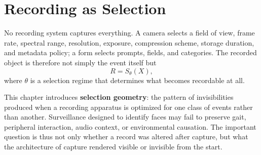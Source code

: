 
\chapter{Recording as Selection}
\label{ch:ch008}


No recording system captures everything. A camera selects a field of view, frame rate, spectral range, resolution, exposure, compression scheme, storage duration, and metadata policy; a form selects prompts, fields, and categories. The recorded object is therefore not simply the event itself but
\[
R=S_\theta(X),
\]
where \(\theta\) is a selection regime that determines what becomes recordable at all.

This chapter introduces \textbf{selection geometry}: the pattern of invisibilities produced when a recording apparatus is optimized for one class of events rather than another. Surveillance designed to identify faces may fail to preserve gait, peripheral interaction, audio context, or environmental causation. The important question is thus not only whether a record was altered after capture, but what the architecture of capture rendered visible or invisible from the start.
